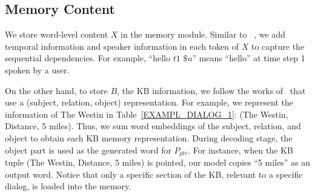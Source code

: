 \documentclass[11pt,a4paper]{article}
\begin{document}
\subsection{Memory Content}
We store word-level content $X$ in the memory module. Similar to ~\citet{bordes2016learning}, we add temporal information and speaker information in each token of $X$ to capture the sequential dependencies. For example, ``hello $t1$ $\$u$'' means ``hello'' at time step 1 spoken by a user.

On the other hand, to store $B$, the KB information, we follow the works of~\citet{miller-EtAl:2016:EMNLP2016,ericKVR2017} that use a (subject, relation, object) representation. 
For example, we represent the information of The Westin in Table~\ref{EXAMPL_DIALOG_1}: (The Westin, Distance, 5 miles). Thus, we sum word embeddings of the subject, relation, and object to obtain each KB memory representation. During decoding stage, the object part is used as the generated word for $P_{ptr}$. For instance, when the KB tuple (The Westin, Distance, 5 miles) is pointed, our model copies ``5 miles'' as an output word. Notice that only a specific section of the KB, relevant to a specific dialog, is loaded into the memory.

\begin{table}[t]
\centering
{}
\setlength{\abovecaptionskip}{-3pt} 
\caption{Dataset statistics for 3 different datasets.}
\label{Tab:statistic}
\end{table}
\end{document}
